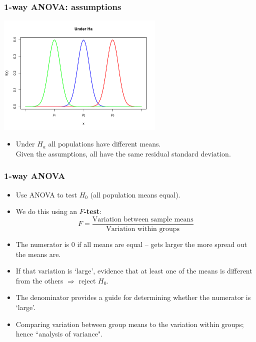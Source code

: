 \documentclass[12pt,xcolor=dvipsnames,handout,mathserif,aspectratio=169]{beamer}
\newcommand{\bbl}[1]{{\color{NavyBlue} \textbf{#1}}}
\begin{document}
\begin{frame}\frametitle{1-way ANOVA: assumptions}
\vspace{-0.5cm}
\begin{center}
\includegraphics[width= 8cm]{UnderHa.pdf}
\end{center}
\vspace{-0.5cm}
\begin{itemize}
\item Under $H_a$ all populations have different means.\\
Given the assumptions, all have the same residual standard deviation.
\end{itemize}
\end{frame}

\begin{frame}\frametitle{1-way ANOVA}
\begin{itemize}
\item Use ANOVA to test $H_0$ (all population means equal). 
\item We do this using an \bbl{$F$-test}:
$$F = \frac{\mbox{Variation between sample means}}{\mbox{Variation within groups}}$$
\item The numerator is 0 if all means are equal -- gets larger the more spread out the means are. 
\item If that variation is `large', evidence that at least one of the means is different from the others $\Rightarrow$ reject $H_0$.
\item The denominator provides a 
guide for determining whether the numerator is `large'.
\item Comparing variation between group means to the variation within groups; hence ``analysis of variance".
\end{itemize}
\end{frame}
\end{document}
